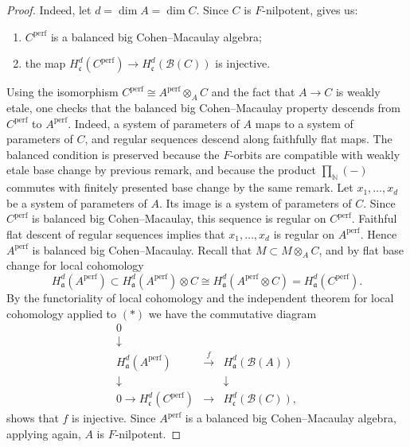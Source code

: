 \documentclass[10pt,a4paper]{amsart}
\theoremstyle{definition}
\theoremstyle{remark}
\begin{document}
\begin{proof}
Indeed, let \(d=\dim A=\dim C \). Since \(C\) is \(F\)-nilpotent,   \cite[Proposition 12.23]{MP} gives us:
	\begin{enumerate}
		\item \(C^{\mathrm{perf}}\) is a balanced big Cohen--Macaulay algebra;
		\item the map
		\(
		H^d_{\mathfrak c}(C^{\mathrm{perf}})\to
		H^d_{\mathfrak c}(\mathcal B(C))
		\)
		is injective.
	\end{enumerate}
	

	Using the isomorphism
	\(
	C^{\mathrm{perf}}\cong A^{\mathrm{perf}}\otimes_A C
	\)
	and the fact that \(A\to C\) is weakly etale, one checks that the balanced big
	Cohen--Macaulay property descends from \(C^{\mathrm{perf}}\) to
	\(A^{\mathrm{perf}}\). Indeed, a system of parameters of \(A\) maps to a system of
	parameters of \(C\), and regular sequences descend along faithfully flat maps.
	The balanced condition is preserved because the \(F\)-orbits are compatible with
	weakly etale base change by previous remark, and because the
	product \(\prod_{\mathbb N}(-)\) commutes with finitely presented base change by the same
remark.
Let
\(
x_1,\ldots,x_d
\)
be a system of parameters of \(A\). Its image is a system of parameters of
\(C\). Since \(C^{\mathrm{perf}}\) is balanced big Cohen--Macaulay, this
sequence is regular on \(C^{\mathrm{perf}}\). Faithful flat descent of
regular sequences implies that
\(
x_1,\ldots,x_d
\)
is regular on \(A^{\mathrm{perf}}\). Hence \(A^{\mathrm{perf}}\) is balanced
big Cohen--Macaulay.
Recall  that $M\subset M\otimes_AC$, and by flat base change for local cohomology 	$$H^d_{\mathfrak a}(A^{\mathrm{perf}})\subset H^d_{\mathfrak a}(A^{\mathrm{perf}})\otimes C\cong H^d_{\mathfrak a}(A^{\mathrm{perf}}\otimes C)=
H^d_{\mathfrak a}(C^{\mathrm{perf}}).$$	
By the functoriality of local cohomology and the independent theorem for local cohomology applied to $(\ast)$
we have 
the  
commutative diagram
	\[
	\begin{array}{ccc}	0 & 
  \\
	\downarrow\\
	H^d_{\mathfrak a}(A^{\mathrm{perf}}) & \stackrel{f }\longrightarrow &
	H^d_{\mathfrak a}(\mathcal B(A)) \\[1mm]
	\downarrow & & \downarrow \\[1mm]
0\longrightarrow	H^d_{\mathfrak c}(C^{\mathrm{perf}}) & \longrightarrow &
	H^d_{\mathfrak c}(\mathcal B(C)),
	\end{array}
	\]
  shows	that $f$
  	is injective. Since \(A^{\mathrm{perf}}\) is a balanced big Cohen--Macaulay algebra,
 applying  \cite[Proposition 12.23]{MP}   again, \(A\) is
	\(F\)-nilpotent.
\end{proof}
\end{document}
